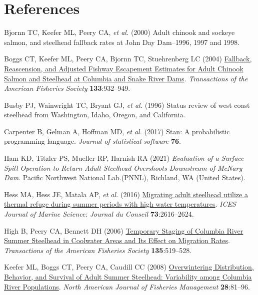 \documentclass[
  12pt,
]{report}
\newlength{\cslhangindent}
\newlength{\cslentryspacingunit} %
\newenvironment{CSLReferences}[2] %
 {%
  \setlength{\parindent}{0pt}
  \ifodd #1
  \let\oldpar\par
  \def\par{\hangindent=\cslhangindent\oldpar}
  \fi
  \setlength{\parskip}{#2\cslentryspacingunit}
 }%
 {}
\begin{document}
\hypertarget{references}{%
\chapter{References}\label{references}}

\hypertarget{refs}{}
\begin{CSLReferences}{1}{0}
\leavevmode{}%
Bjornn TC, Keefer ML, Peery CA, \emph{et al.} (2000) {Adult chinook and
sockeye salmon, and steelhead fallback rates at John Day Dam--1996, 1997
and 1998}.

\leavevmode{}%
Boggs CT, Keefer ML, Peery CA, Bjornn TC, Stuehrenberg LC (2004)
\href{https://doi.org/10.1577/t03-133.1}{{Fallback, Reascension, and
Adjusted Fishway Escapement Estimates for Adult Chinook Salmon and
Steelhead at Columbia and Snake River Dams}}. \emph{Transactions of the
American Fisheries Society} \textbf{133}:932--949.

\leavevmode{}%
Busby PJ, Wainwright TC, Bryant GJ, \emph{et al.} (1996) {Status review
of west coast steelhead from Washington, Idaho, Oregon, and California}.

\leavevmode{}%
Carpenter B, Gelman A, Hoffman MD, \emph{et al.} (2017) {Stan: A
probabilistic programming language}. \emph{Journal of statistical
software} \textbf{76}.

\leavevmode{}%
Ham KD, Titzler PS, Mueller RP, Harnish RA (2021) \emph{{Evaluation of a
Surface Spill Operation to Return Adult Steelhead Overshoots Downstream
of McNary Dam}}. Pacific Northwest National Lab.(PNNL), Richland, WA
(United States).

\leavevmode{}%
Hess MA, Hess JE, Matala AP, \emph{et al.} (2016)
\href{https://doi.org/10.1093/icesjms/fsw120}{{Migrating adult steelhead
utilize a thermal refuge during summer periods with high water
temperatures}}. \emph{ICES Journal of Marine Science: Journal du
Conseil} \textbf{73}:2616--2624.

\leavevmode{}%
High B, Peery CA, Bennett DH (2006)
\href{https://doi.org/10.1577/t04-224.1}{{Temporary Staging of Columbia
River Summer Steelhead in Coolwater Areas and Its Effect on Migration
Rates}}. \emph{Transactions of the American Fisheries Society}
\textbf{135}:519--528.

\leavevmode{}%
Keefer ML, Boggs CT, Peery CA, Caudill CC (2008)
\href{https://doi.org/10.1577/m07-011.1}{{Overwintering Distribution,
Behavior, and Survival of Adult Summer Steelhead: Variability among
Columbia River Populations}}. \emph{North American Journal of Fisheries
Management} \textbf{28}:81--96.


\end{CSLReferences}
\end{document}
